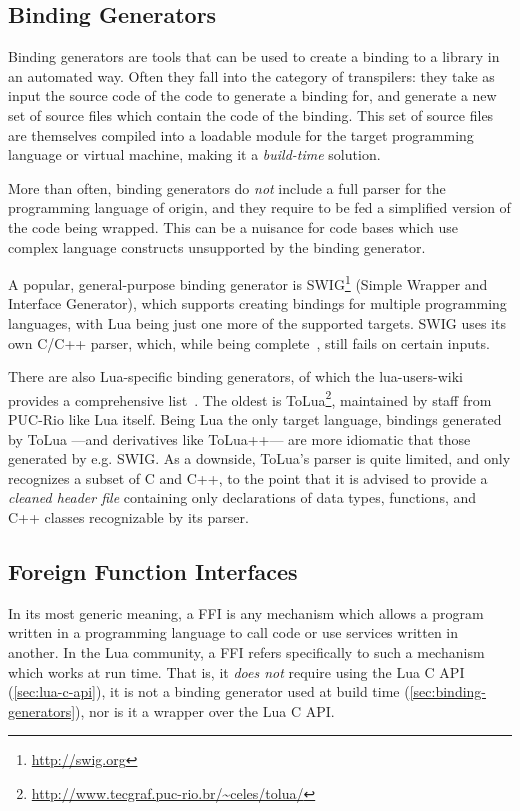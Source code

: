 \subsection{Binding Generators}
	\label{sec:binding-generators}

Binding generators are tools that can be used to create a binding to a library
in an automated way. Often they fall into the category of \glspl{transpiler}:
they take as input the source code of the code to generate a binding for,
and generate a new set of source files which contain the code of the binding.
This set of source files are themselves compiled into a loadable module for
the target programming language or virtual machine, making it a
\emph{build-time} solution.

More than often, binding generators do \emph{not} include a full parser for
the programming language of origin, and they require to be fed a simplified
version of the code being wrapped. This can be a nuisance for code bases which
use complex language constructs unsupported by the binding generator.

A popular, general-purpose binding generator is
SWIG\footnote{\url{http://swig.org}} (Simple Wrapper and Interface Generator),
which supports creating bindings for multiple programming languages, with Lua
being just one more of the supported targets. SWIG uses its own C/C++ parser,
which, while being complete~\cite{swig3doc}, still fails on certain inputs.

There are also Lua-specific binding generators, of which the
\gls{lua-users-wiki} provides a comprehensive
list~\cite{lusers-BindingCodeToLua}. The oldest is
ToLua\footnote{\url{http://www.tecgraf.puc-rio.br/~celes/tolua/}}, maintained
by staff from \gls{PUC-Rio} like Lua itself. Being Lua the only target
language, bindings generated by ToLua —and derivatives like ToLua++— are more
idiomatic that those generated by e.g. SWIG. As a downside, ToLua's parser is
quite limited, and only recognizes a subset of C and C++, to the point that it
is advised to provide a \emph{cleaned header file} containing only
declarations of data types, functions, and C++ classes recognizable by its
parser.


\subsection{Foreign Function Interfaces}
	\label{sec:ffis}

In its most generic meaning, a \gls{FFI} is any mechanism which allows
a program written in a programming language to call code or use services
written in another. In the Lua community, a FFI refers specifically to such
a mechanism which works at run time. That is, it \emph{does not} require using
the Lua C API (\autoref{sec:lua-c-api}), it is not a binding generator used at
build time (\autoref{sec:binding-generators}), nor is it a wrapper over the
Lua C API.

